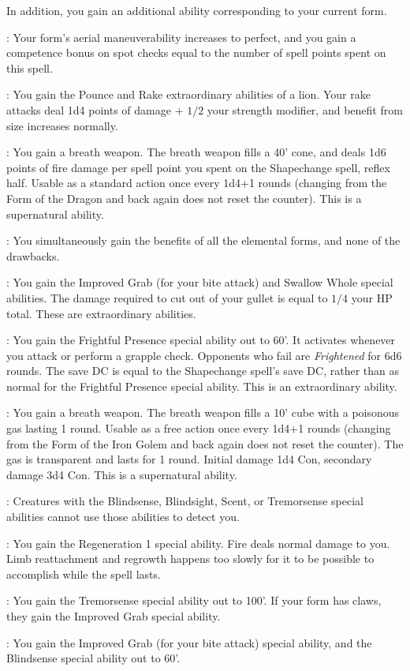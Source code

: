 In addition, you gain an additional ability corresponding to your current form.
\begin{list}{}{\leftmargin=1em}
 \item {}: Your form's aerial maneuverability increases to perfect, and you gain a competence bonus on spot checks equal to the number of spell points spent on this spell.
 \item {}: You gain the Pounce and Rake extraordinary abilities of a lion. 
 Your rake attacks deal 1d4 points of damage + $1/2$ your strength modifier, and benefit from size increases normally.
 \item {}: You gain a breath weapon.
 The breath weapon fills a 40' cone, and deals 1d6 points of fire damage per spell point you spent on the Shapechange spell, reflex half. 
 Usable as a standard action once every 1d4+1 rounds (changing from the Form of the Dragon and back again does not reset the counter).
 This is a supernatural ability.
 \item {}: You simultaneously gain the benefits of all the elemental forms, and none of the drawbacks.
 \item {}: You gain the Improved Grab (for your bite attack) and Swallow Whole special abilities. 
 The damage required to cut out of your gullet is equal to $1/4$ your HP total. These are extraordinary abilities.
 \item {}: You gain the Frightful Presence special ability out to 60'.
 It activates whenever you attack or perform a grapple check.
 Opponents who fail are \emph{Frightened} for 6d6 rounds.
 The save DC is equal to the Shapechange spell's save DC, rather than as normal for the Frightful Presence special ability.
 This is an extraordinary ability.
 \item {}: You gain a breath weapon.
 The breath weapon fills a 10' cube with a poisonous gas lasting 1 round. 
 Usable as a free action once every 1d4+1 rounds (changing from the Form of the Iron Golem and back again does not reset the counter).
 The gas is transparent and lasts for 1 round. 
 Initial damage 1d4 Con, secondary damage 3d4 Con. This is a supernatural ability.
 \item {}: Creatures with the Blindsense, Blindsight, Scent, or Tremorsense special abilities cannot use those abilities to detect you.
 \item {}: You gain the Regeneration 1 special ability. Fire deals normal damage to you. Limb reattachment and regrowth happens too slowly for it to be possible to accomplish while the spell lasts.
 \item {}: You gain the Tremorsense special ability out to 100'. If your form has claws, they gain the Improved Grab special ability.
 \item {}: You gain the Improved Grab (for your bite attack) special ability, and the Blindsense special ability out to 60'.
\end{list}

